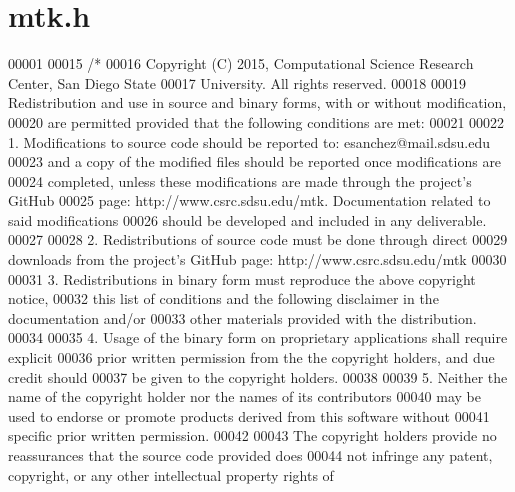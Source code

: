 \hypertarget{mtk_8h_source}{\section{mtk.\+h}
\label{mtk_8h_source}
}

\begin{DoxyCode}
00001 
00015 \textcolor{comment}{/*}
00016 \textcolor{comment}{Copyright (C) 2015, Computational Science Research Center, San Diego State}
00017 \textcolor{comment}{University. All rights reserved.}
00018 \textcolor{comment}{}
00019 \textcolor{comment}{Redistribution and use in source and binary forms, with or without modification,}
00020 \textcolor{comment}{are permitted provided that the following conditions are met:}
00021 \textcolor{comment}{}
00022 \textcolor{comment}{1. Modifications to source code should be reported to: esanchez@mail.sdsu.edu}
00023 \textcolor{comment}{and a copy of the modified files should be reported once modifications are}
00024 \textcolor{comment}{completed, unless these modifications are made through the project's GitHub}
00025 \textcolor{comment}{page: http://www.csrc.sdsu.edu/mtk. Documentation related to said modifications}
00026 \textcolor{comment}{should be developed and included in any deliverable.}
00027 \textcolor{comment}{}
00028 \textcolor{comment}{2. Redistributions of source code must be done through direct}
00029 \textcolor{comment}{downloads from the project's GitHub page: http://www.csrc.sdsu.edu/mtk}
00030 \textcolor{comment}{}
00031 \textcolor{comment}{3. Redistributions in binary form must reproduce the above copyright notice,}
00032 \textcolor{comment}{this list of conditions and the following disclaimer in the documentation and/or}
00033 \textcolor{comment}{other materials provided with the distribution.}
00034 \textcolor{comment}{}
00035 \textcolor{comment}{4. Usage of the binary form on proprietary applications shall require explicit}
00036 \textcolor{comment}{prior written permission from the the copyright holders, and due credit should}
00037 \textcolor{comment}{be given to the copyright holders.}
00038 \textcolor{comment}{}
00039 \textcolor{comment}{5. Neither the name of the copyright holder nor the names of its contributors}
00040 \textcolor{comment}{may be used to endorse or promote products derived from this software without}
00041 \textcolor{comment}{specific prior written permission.}
00042 \textcolor{comment}{}
00043 \textcolor{comment}{The copyright holders provide no reassurances that the source code provided does}
00044 \textcolor{comment}{not infringe any patent, copyright, or any other intellectual property rights of}

\end{DoxyCode}

